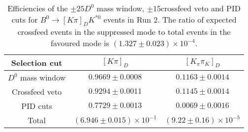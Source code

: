 \begin{table}
    \centering
    \begin{tabular}{ccc}
        \toprule
Selection cut & $[K \pi]_D$ & $[K_\pi \pi_K]_D$ \\
        \midrule
$D^0$ mass window & $0.9669 \pm 0.0008$ & $0.1163 \pm 0.0014$ \\
Crossfeed veto & $0.9294 \pm 0.0011$ & $0.1145 \pm 0.0014$ \\
PID cuts & $0.7729 \pm 0.0013$ & $0.0069 \pm 0.0016$\\
        \midrule
Total & $(6.946 \pm 0.015) \times 10^{-1}$ & $(9.22 \pm 0.16) \times 10^{-5}$\\
        \bottomrule
    \end{tabular}
    \caption{Efficiencies of the $\pm 25$\mev $D^0$ mass window, $\pm 15$\mev crossfeed veto and PID cuts for $B^0 \to [K\pi]_D K^{*0}$ events in Run 2. The ratio of expected crossfeed events in the suppressed mode to total events in the favoured mode is $(1.327 \pm 0.023) \times 10^{-4}$.}
\label{tab:double_misID_eff_Kpi_run2}
\end{table}

